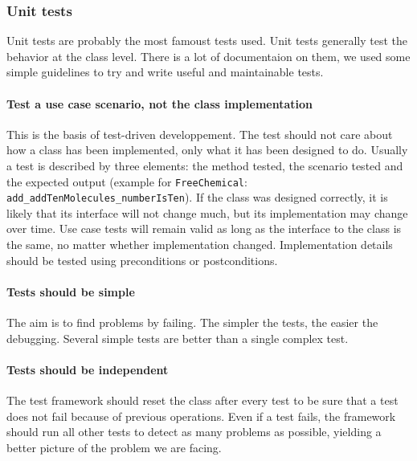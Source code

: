 \subsubsection{Unit tests}

Unit tests are probably the most famoust tests used. Unit tests generally test the behavior at the class level. There is a lot of documentaion on them, we used some simple guidelines to try and write useful and maintainable tests.

\paragraph{Test a use case scenario, not the class implementation} This is the basis of test-driven developpement. The test should not care about how a class has been implemented, only what it has been designed to do. Usually a test is described by three elements: the method tested, the scenario tested and the expected output (example for \texttt{FreeChemical}: \texttt{add\_addTenMolecules\_numberIsTen}). If the class was designed correctly, it is likely that its interface will not change much, but its implementation may change over time. Use case tests will remain valid as long as the interface to the class is the same, no matter whether implementation changed. Implementation details should be tested using preconditions or postconditions.

\paragraph{Tests should be simple} The aim is to find problems by failing. The simpler the tests, the easier the debugging. Several simple tests are better than a single complex test.

\paragraph{Tests should be independent} The test framework should reset the class after every test to be sure that a test does not fail because of previous operations. Even if a test fails, the framework should run all other tests to detect as many problems as possible, yielding a better picture of the problem we are facing.

